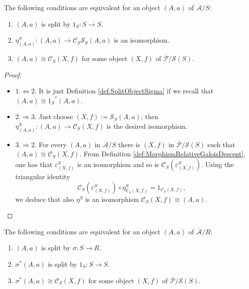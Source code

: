 \begin{lemma}
\label{lem:ObjectsSplitUnit}
    The following conditions are equivalent for an object $(A,a)$ of $\overline{\mathcal{A}}/S$:
    \begin{enumerate}
        \item $(A,a)$ is split by $1_S:S\to S$.
        \item $\eta_{(A,a)}^S:(A,a)\longrightarrow\mathcal{C}_S\mathcal{S}_S(A,a)$ is an isomorphism.
        \item $(A,a)\cong\mathcal{C}_S(X,f)$ for some object $(X,f)$ of $\overline{\mathcal{P}}/\mathcal{S}(S)$.
    \end{enumerate}
    \begin{proof}
        \begin{itemize}
            \item[] $1.\iff 2.$ It is just Definition \ref{def:SplitObjectSigma} if we recall that $(A,a)\cong {1_S}^*(A,a)$.     
            \item[] $2. \Rightarrow 3.$ Just choose $(X,f):=\mathcal{S}_S(A,a)$; then $\eta^S_{(A,a)}:(A,a)\longrightarrow\mathcal{C}_S(X,f)$ is the desired isomorphism.
            \item[] $3. \Rightarrow 2.$ For every $(A,a)$ in $\overline{\mathcal{A}}/S$ there is $(X,f)$ in $\overline{\mathcal{P}}/\mathcal{S}(S)$ such that $(A,a)\cong \mathcal{C}_S(X,f)$. From Definition \ref{def:MorphismRelativeGaloisDescent}, one has that $\varepsilon^S_{(X,f)}$ is an isomorphism and so is $\mathcal{C}_S(\varepsilon^S_{(X,f)})$. Using the triangular identity
            \[ \mathcal{C}_S(\varepsilon^S_{(X,f)}) \circ \eta^S_{\mathcal{C}_S(X,f)} = 1_{\mathcal{C}_S(X,f)}, \]
            we deduce that also $\eta^S$ is an isomorphism $\mathcal{C}_S(X,f)\cong(A,a)$.
        \end{itemize}
    \end{proof}
\end{lemma}
\begin{corollary}
\label{cor:ObjectsSplitSigma}
    The following conditions are equivalent for an object $(A,a)$ of $\overline{\mathcal{A}}/R$:
    \begin{enumerate}
        \item $(A,a)$ is split by $\sigma:S\to R$.
        \item $\sigma^*(A,a)$ is split by $1_S:S\to S$.
        \item $\sigma^*(A,a)\cong\mathcal{C}_S(X,f)$ for some object $(X,f)$ of $\overline{\mathcal{P}}/\mathcal{S}(S)$.
    \end{enumerate}
\end{corollary}

